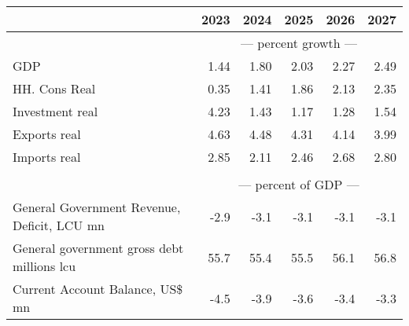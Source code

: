 \documentclass{article}
\begin{document}
\begin{table}[ht]
\begin{tabular}{lrrrrr}
\toprule
 & 2023 & 2024 & 2025 & 2026 & 2027 \\
\midrule
&\multicolumn{5}{c}{{--- percent growth ---}}                                                                                                     \\
GDP & 1.44 & 1.80 & 2.03 & 2.27 & 2.49 \\
HH. Cons Real & 0.35 & 1.41 & 1.86 & 2.13 & 2.35 \\
Investment real & 4.23 & 1.43 & 1.17 & 1.28 & 1.54 \\
Exports real & 4.63 & 4.48 & 4.31 & 4.14 & 3.99 \\
Imports real & 2.85 & 2.11 & 2.46 & 2.68 & 2.80 \\
&\multicolumn{5}{c}{{ }}                                                                                                     \\
&\multicolumn{5}{c}{{--- percent of GDP ---}}                                                                                                     \\
General Government Revenue, Deficit, LCU mn & -2.9 & -3.1 & -3.1 & -3.1 & -3.1 \\
General government gross debt millions lcu & 55.7 & 55.4 & 55.5 & 56.1 & 56.8 \\
Current Account Balance, US\$ mn & -4.5 & -3.9 & -3.6 & -3.4 & -3.3 \\
\bottomrule
\end{tabular}
\end{table}


\end{document}
